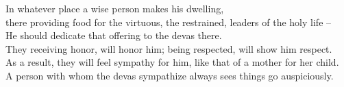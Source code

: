 \begin{english}
  In whatever place a wise person makes his dwelling,\\
  there providing food for the virtuous, the restrained, leaders of the holy life --\\
  He should dedicate that offering to the devas there.\\
  They receiving honor, will honor him; being respected, will show him respect.\\
  As a result, they will feel sympathy for him, like that of a mother for her child.\\
  A person with whom the devas sympathize always sees things go auspiciously.
\end{english}



